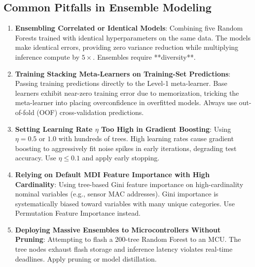 \subsection{Common Pitfalls in Ensemble Modeling}\label{subsec:ensembles_pitfalls}

\begin{warning}
\begin{enumerate}
    \item \textbf{Ensembling Correlated or Identical Models}:
    Combining five Random Forests trained with identical hyperparameters on the same data. The models make identical errors, providing zero variance reduction while multiplying inference compute by $5\times$. Ensembles require **diversity**.

    \item \textbf{Training Stacking Meta-Learners on Training-Set Predictions}:
    Passing training predictions directly to the Level-1 meta-learner. Base learners exhibit near-zero training error due to memorization, tricking the meta-learner into placing overconfidence in overfitted models. Always use out-of-fold (OOF) cross-validation predictions.

    \item \textbf{Setting Learning Rate $\eta$ Too High in Gradient Boosting}:
    Using $\eta = 0.5$ or $1.0$ with hundreds of trees. High learning rates cause gradient boosting to aggressively fit noise spikes in early iterations, degrading test accuracy. Use $\eta \le 0.1$ and apply early stopping.

    \item \textbf{Relying on Default MDI Feature Importance with High Cardinality}:
    Using tree-based Gini feature importance on high-cardinality nominal variables (e.g., sensor MAC addresses). Gini importance is systematically biased toward variables with many unique categories. Use Permutation Feature Importance instead.

    \item \textbf{Deploying Massive Ensembles to Microcontrollers Without Pruning}:
    Attempting to flash a 200-tree Random Forest to an MCU. The tree nodes exhaust flash storage and inference latency violates real-time deadlines. Apply pruning or model distillation.
\end{enumerate}
\end{warning}

